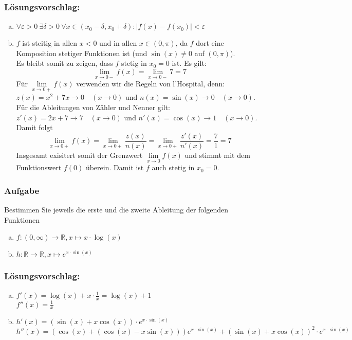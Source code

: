 \documentclass[a4paper,11pt]{scrartcl}
\newcounter{auf}
\newcommand{\Aufgabe}%
        {\addtocounter{auf}{1} \subsubsection*{\rmfamily  Aufgabe \theauf \hspace{1em}} }
\newcommand{\RR}{\mathbb{R}}
\begin{document}
\subsubsection*{Lösungsvorschlag:}
\begin{enumerate}[a)]
\item $\forall \varepsilon >0\ \exists \delta>0\ \forall x \in (x_0-\delta, x_0+\delta): |f(x)-f(x_0)|< \varepsilon$
\item $f$ ist steitig in allen $x<0$ und in allen $x \in (0,\pi)$, da $f$ dort eine Komposition stetiger Funktionen ist (und $\sin(x)\ne 0$ auf $(0,\pi)$).\\ 
Es bleibt somit zu zeigen, dass $f$ stetig in $x_0=0$ ist. Es gilt:
$$
\lim_{x \to 0-} f(x)=\lim_{x \to 0-} 7 =7
$$
Für $\lim \limits_{x \to 0+} f(x)$ verwenden wir die Regeln von l'Hospital, denn:\\
$z(x)=x^2+7x \to 0 \quad (x \to 0)$ und $n(x)=\sin(x) \to 0 \quad (x\to 0)$.\\
Für die Ableitungen von Zähler und Nenner gilt:\\
$z'(x)=2x+7 \to 7 \quad (x \to 0)$ und $n'(x)=\cos(x) \to 1 \quad (x\to 0)$.\\
Damit folgt
$$
\lim_{x \to 0+} f(x)=\lim_{x \to 0+} \frac{z(x)}{n(x)}=\lim_{x \to 0+} \frac{z'(x)}{n'(x)}=\frac{7}{1}=7
$$
Insgesamt exisitert somit der Grenzwert $\lim \limits_{x \to 0} f(x)$ und stimmt mit dem Funktionswert $f(0)$ überein. Damit ist $f$ auch stetig in $x_0=0$.
\end{enumerate}



\newpage
\Aufgabe
Bestimmen Sie jeweils die erste und die zweite Ableitung der folgenden Funktionen

\begin{enumerate}[a)]
\item $f:(0,\infty) \to \RR, x \mapsto x \cdot \log(x) $
\item $h:\RR \to \RR, x \mapsto e^{x\cdot \sin(x)} $
\end{enumerate}


\subsubsection*{Lösungsvorschlag:}
\begin{enumerate}[a)]
\item $f'(x)=\log(x)+x\cdot \frac{1}{x}=\log(x)+1$\\ $f''(x)=\frac{1}{x}$
\item $h'(x)=(\sin(x)+x\cos(x))\cdot e^{x\cdot \sin(x)}$\\ $h''(x)=\left(\cos(x)+(\cos(x)-x\sin(x))\right)e^{x\cdot \sin(x)} + (\sin(x)+x\cos(x))^2\cdot e^{x\cdot \sin(x)}$
\end{enumerate}
\end{document}
